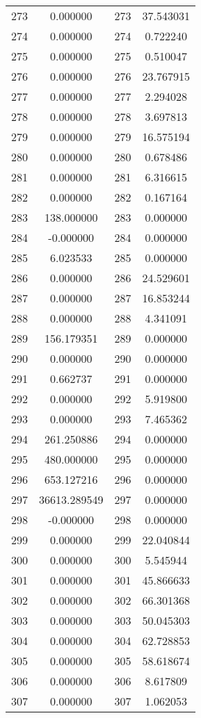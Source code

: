 \documentclass[12pt]{article}
\begin{document}
\begin{longtable}{@{}cccc@{}}
273 & 0.000000 & 273 & 37.543031 \\
274 & 0.000000 & 274 & 0.722240 \\
275 & 0.000000 & 275 & 0.510047 \\
276 & 0.000000 & 276 & 23.767915 \\
277 & 0.000000 & 277 & 2.294028 \\
278 & 0.000000 & 278 & 3.697813 \\
279 & 0.000000 & 279 & 16.575194 \\
280 & 0.000000 & 280 & 0.678486 \\
281 & 0.000000 & 281 & 6.316615 \\
282 & 0.000000 & 282 & 0.167164 \\
283 & 138.000000 & 283 & 0.000000 \\
284 & -0.000000 & 284 & 0.000000 \\
285 & 6.023533 & 285 & 0.000000 \\
286 & 0.000000 & 286 & 24.529601 \\
287 & 0.000000 & 287 & 16.853244 \\
288 & 0.000000 & 288 & 4.341091 \\
289 & 156.179351 & 289 & 0.000000 \\
290 & 0.000000 & 290 & 0.000000 \\
291 & 0.662737 & 291 & 0.000000 \\
292 & 0.000000 & 292 & 5.919800 \\
293 & 0.000000 & 293 & 7.465362 \\
294 & 261.250886 & 294 & 0.000000 \\
295 & 480.000000 & 295 & 0.000000 \\
296 & 653.127216 & 296 & 0.000000 \\
297 & 36613.289549 & 297 & 0.000000 \\
298 & -0.000000 & 298 & 0.000000 \\
299 & 0.000000 & 299 & 22.040844 \\
300 & 0.000000 & 300 & 5.545944 \\
301 & 0.000000 & 301 & 45.866633 \\
302 & 0.000000 & 302 & 66.301368 \\
303 & 0.000000 & 303 & 50.045303 \\
304 & 0.000000 & 304 & 62.728853 \\
305 & 0.000000 & 305 & 58.618674 \\
306 & 0.000000 & 306 & 8.617809 \\
307 & 0.000000 & 307 & 1.062053 \\

\end{longtable}
\end{document}
